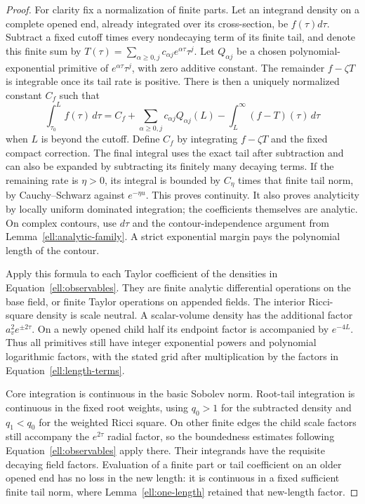 \begin{proof}
For clarity fix a normalization of finite parts.  Let an
integrand density on a complete opened end, already integrated
over its cross-section, be $f(\tau)d\tau$.  Subtract a fixed
cutoff times every nondecaying term of its finite tail,
and denote this finite sum by
$T(\tau)=\sum_{\alpha\ge0,j}c_{\alpha j}e^{\alpha\tau}\tau^j$.
Let $Q_{\alpha j}$ be a chosen polynomial-exponential primitive
of $e^{\alpha\tau}\tau^j$, with zero additive constant.
The remainder $f-\zeta T$ is integrable once its tail rate is
positive.  There is then a uniquely normalized constant $C_f$
such that
\begin{equation}
 \int_{\tau_0}^{L}f(\tau)\,d\tau
 =C_f+\sum_{\alpha\ge0,j}c_{\alpha j}Q_{\alpha j}(L)
             -\int_L^\infty(f-T)(\tau)\,d\tau
 \label{ell:finite-part-formula}
\end{equation}
when $L$ is beyond the cutoff.  Define $C_f$ by integrating
$f-\zeta T$ and the fixed compact correction.  The final
integral uses the exact tail after subtraction and can also
be expanded by subtracting its finitely many decaying terms.
If the remaining rate is $\eta>0$, its integral is bounded
by $C_\eta$ times that finite tail norm, by Cauchy--Schwarz
against $e^{-\eta u}$.  This proves continuity.  It also proves
analyticity by locally uniform dominated integration; the
coefficients themselves are analytic.  On complex contours,
use $d\tau$ and the contour-independence argument from
Lemma~\ref{ell:analytic-family}.  A strict exponential margin
pays the polynomial length of the contour.

Apply this formula to each Taylor coefficient of the densities
in Equation~\eqref{ell:observables}.  They are finite analytic
differential operations on the base field, or finite Taylor
operations on appended fields.  The interior Ricci-square
density is scale neutral.  A scalar-volume density has the
additional factor $a_v^2e^{\pm2\tau}$.  On a newly opened
child half its endpoint factor is accompanied by $e^{-4L}$.
Thus all primitives still have integer exponential powers
and polynomial logarithmic factors, with the stated grid
after multiplication by the factors in
Equation~\eqref{ell:length-terms}.

Core integration is continuous in the basic Sobolev norm.
Root-tail integration is continuous in the fixed root weights,
using $q_0>1$ for the subtracted density and $q_1<q_0$ for
the weighted Ricci square.  On other finite edges the child
scale factors still accompany the $e^{2\tau}$ radial factor,
so the boundedness estimates following
Equation~\eqref{ell:observables} apply there.  Their integrands
have the requisite decaying field factors.  Evaluation of a
finite part or tail coefficient on an older opened end has
no loss in the new length: it is continuous in a fixed
sufficient finite tail norm, where
Lemma~\ref{ell:one-length} retained that new-length factor.


\end{proof}
